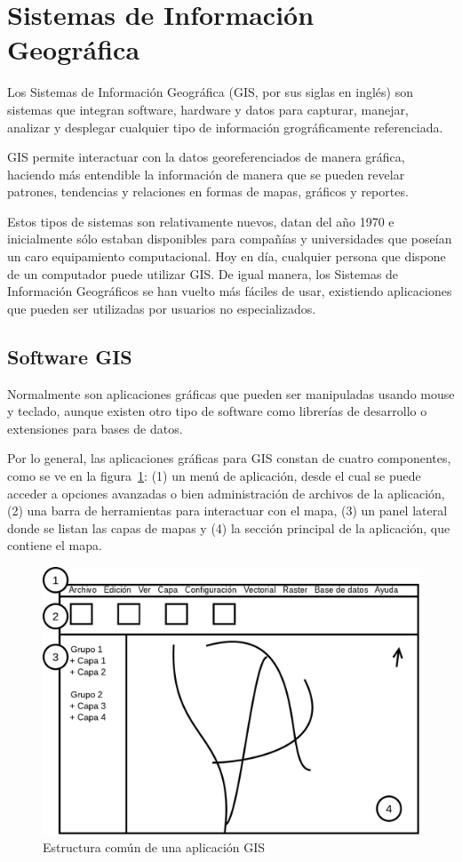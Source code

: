 \section{Sistemas de Información Geográfica}

Los Sistemas de Información Geográfica (GIS, por sus siglas en inglés) son sistemas que integran
software, hardware y datos para capturar, manejar, analizar y desplegar cualquier tipo de
información grográficamente referenciada.

GIS permite interactuar con la datos georeferenciados de manera gráfica, haciendo más entendible la
información de manera que se pueden revelar patrones, tendencias y relaciones en formas de mapas,
gráficos y reportes. 

Estos tipos de sistemas son relativamente nuevos, datan del año 1970 e inicialmente sólo estaban
disponibles para compañías y universidades que poseían un caro equipamiento computacional. Hoy en
día, cualquier persona que dispone de un computador puede utilizar GIS. De igual manera, los
Sistemas de Información Geográficos se han vuelto más fáciles de usar, existiendo aplicaciones que
pueden ser utilizadas por usuarios no especializados.

\subsection{Software GIS}
Normalmente son aplicaciones gráficas que pueden ser manipuladas usando mouse y teclado, aunque
existen otro tipo de software como librerías de desarrollo o extensiones para bases de datos.

Por lo general, las aplicaciones gráficas para GIS constan de cuatro componentes, como se ve en la
figura~\ref{aplicaciongis}: (1) un menú de aplicación, desde el cual se puede acceder a opciones
avanzadas o bien administración de archivos de la aplicación, (2) una barra de herramientas para
interactuar con el mapa, (3) un panel lateral donde se listan las capas de mapas y (4) la sección 
principal de la aplicación, que contiene el mapa.

\begin{figure}[h]
  \centering
  \caption{Estructura común de una aplicación GIS}
  \label{aplicaciongis}
  \includegraphics[scale=0.4]{gis_app}
\end{figure}

